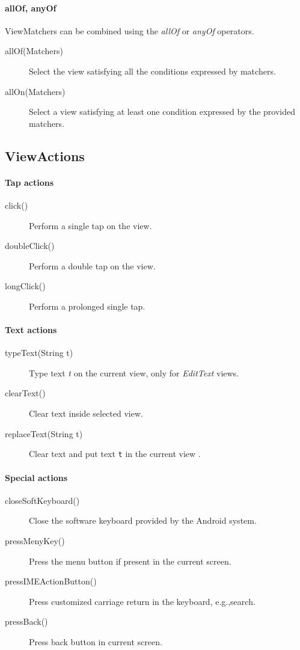\paragraph{allOf, anyOf}
ViewMatchers can be combined using the \emph{allOf} or \emph{anyOf} operators.
\begin{description}
\item [allOf(Matchers)] Select the view satisfying all the conditions expressed by matchers.
\item [allOn(Matchers)] Select a view satisfying at least one condition expressed by the provided matchers.
\end{description}

\subsection{ViewActions}
\paragraph{Tap actions}
\begin{description}
\item [click()] Perform a single tap on the view.
\item [doubleClick()] Perform a double tap on the view.
\item [longClick()] Perform a prolonged single tap.
\end{description}

\paragraph{Text actions}
\begin{description}
\item [typeText(String t)] Type text \emph{t} on the current view, only for \emph{EditText} views.
\item [clearText()] Clear text inside selected view.
\item [replaceText(String t)] Clear text and put text \texttt{t} in the current view .
\end{description}

\paragraph{Special actions}
\begin{description}
\item [closeSoftKeyboard()] Close the software keyboard provided by the Android system.
\item [pressMenyKey()] Press the menu button if present in the current screen.
\item [pressIMEActionButton()] Press customized carriage return in the keyboard, e.g.,\@ search.
\item [pressBack()] Press back button in current screen.
\end{description}

